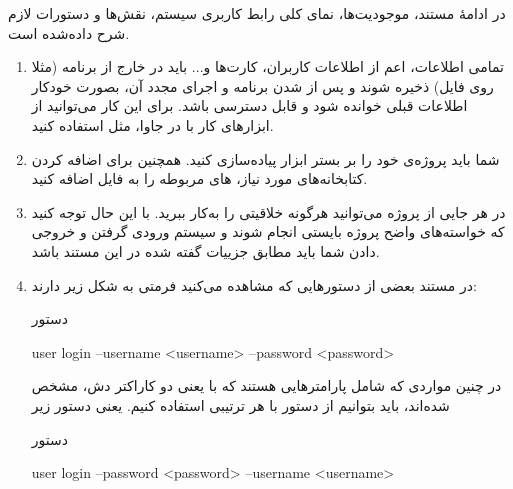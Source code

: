 \documentclass[]{article}
\begin{document}
در ادامهٔ مستند، موجودیت‌ها، نمای کلی رابط کاربری سیستم، نقش‌ها و دستورات لازم شرح داده‌شده است.

\begin{enumerate}[label={نکته \arabic*:}]
\item
 تمامی اطلاعات، اعم از اطلاعات کاربران، کارت‌ها و... باید در خارج از برنامه (مثلا روی فایل) ذخیره شوند و پس از  شدن برنامه و اجرای مجدد آن، بصورت خودکار اطلاعات قبلی خوانده شود و قابل دسترسی باشد. برای این کار می‌توانید از ابزارهای کار با  در جاوا، مثل
  \href{https://www.tutorialspoint.com/gson/gson_quick_guide.htm}{\textcolor{blue}{}}
   استفاده‌ کنید.

\item
شما باید پروژه‌ی خود را بر بستر ابزار  پیاده‌سازی کنید. همچنین برای اضافه کردن کتابخانه‌های مورد نیاز،  های مربوطه را به فایل  اضافه کنید.




   

\item
در هر جایی از پروژه می‌توانید هرگونه خلاقیتی را به‌کار ببرید. با این حال توجه کنید که خواسته‌های واضح پروژه بایستی انجام شوند و سیستم ورودی گرفتن و خروجی دادن شما باید مطابق جزییات گفته شده در این مستند باشد.


\item
در مستند بعضی از دستور‌هایی که مشاهده می‌کنید فرمتی به شکل زیر دارند:

\begin{mybox}[colback=yellow]{دستور}
	
	
	\begin{latin}
		
	user login --username <username> --password <password>
		
	\end{latin}
	
\end{mybox}

در چنین مواردی که شامل پارامتر‌هایی هستند که با
\lr{--}
یعنی دو کاراکتر دش، مشخص شده‌اند، باید بتوانیم از دستور با هر ترتیبی استفاده کنیم. یعنی دستور زیر

\begin{mybox}[colback=yellow]{دستور}
	
	
	\begin{latin}
		
		user login --password <password> --username <username> 
		
	\end{latin}
	

\end{mybox}
\end{enumerate}
\end{document}

